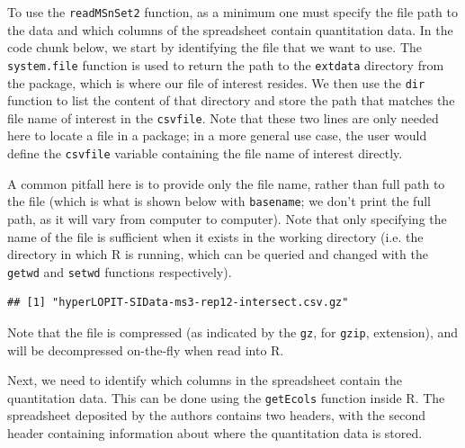 To use the \texttt{readMSnSet2} function, as a minimum one must
specify the file path to the data and which columns of the spreadsheet
contain quantitation data. In the code chunk below, we start by
identifying the file that we want to use. The \texttt{system.file}
function is used to return the path to the \texttt{extdata} directory
from the  package, which is where our file of
interest resides. We then use the \texttt{dir} function to list the
content of that directory and store the path that matches the file
name of interest in the \texttt{csvfile}. Note that these two lines
are only needed here to locate a file in a package; in a more general
use case, the user would define the \texttt{csvfile} variable
containing the file name of interest directly.

A common pitfall here is to provide only the file name, rather than
full path to the file (which is what is shown below with
\texttt{basename}; we don't print the full path, as it will vary from
computer to computer). Note that only specifying the name of the file
is sufficient when it exists in the working directory (i.e. the
directory in which R is running, which can be queried and changed with
the \texttt{getwd} and \texttt{setwd} functions respectively).

\begin{knitrout}
\color{fgcolor}\begin{kframe}
\begin{alltt}
 \hlkwb{<-} \hlstd{(}\hlstd{,}  \hlstd{=} \hlstd{)}
 \hlkwb{<-}   \hlstd{=} \hlstd{,}
           \hlstd{=} \hlstd{)}
\end{alltt}
\begin{verbatim}
## [1] "hyperLOPIT-SIData-ms3-rep12-intersect.csv.gz"
\end{verbatim}
\end{kframe}
\end{knitrout}

Note that the file is compressed (as indicated by the \texttt{gz}, for
\texttt{gzip}, extension), and will be decompressed on-the-fly when
read into R.

Next, we need to identify which columns in the spreadsheet contain the
quantitation data. This can be done using the \texttt{getEcols}
function inside R. The spreadsheet deposited by the authors contains
two headers, with the second header containing information about where
the quantitation data is stored.

